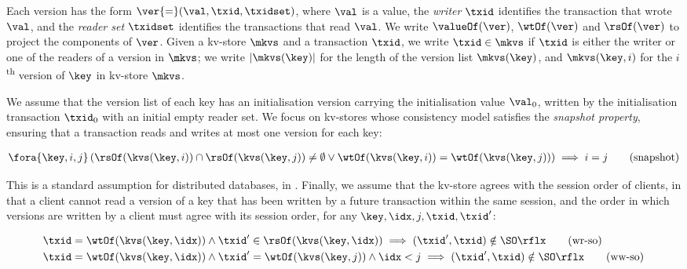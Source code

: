 Each version has the form 
\(\ver {=} (\val, \txid, \txidset)\), where \(\val\) is
a value, the \emph{writer} \(\txid\) identifies the transaction that
wrote \(\val\),  and the \emph{reader set} \(\txidset\) identifies the
transactions that read \(\val\). We write
\(\valueOf(\ver)\),
\(\wtOf(\ver)\) and \(\rsOf(\ver)\) to project
the components of \(\ver\).
Given a kv-store \(\mkvs\) and a transaction \(\txid\), we write 
\(\txid \in \mkvs\) if \(\txid\) is either the writer or 
one of the readers of a version in \(\mkvs\);
we write \(\lvert \mkvs(\key) \rvert\) for the length of the version
list \(\mkvs(\key)\),
and \(\mkvs(\key, i)\) for the \(i\)\textsuperscript{th} version of
\(\key\) in kv-store $\mkvs$.

We assume that the version list of each key has an initialisation version 
carrying the initialisation value \(\val_0\),  written by the 
initialisation transaction \(\txid_0\) with an initial empty reader set.
We focus on kv-stores whose consistency model satisfies the
\emph{snapshot property}, ensuring that
a transaction reads and writes at most one version for each key:

\SpaceAboveMath
\begin{align}
\fora{\key, i, j} 
\left( \rsOf(\kvs(\key, i)) \cap \rsOf(\kvs(\key, j)) \neq \emptyset \lor
\wtOf(\kvs(\key, i)) = \wtOf(\kvs(\key, j)) \right)
\implies i = j  
\tag{snapshot}
\label{equ:kvs-wf-txid-snapshot-property} 
\end{align}
\SpaceBelowMath

\noindent 
This is a standard assumption for distributed databases, \eg in
\cite{ramp,si,distrsi,clocksi,cops,PSI-RA,SI-RA,NMSI,PSI}.
Finally, we assume that the kv-store agrees with the session order of clients, 
in that a client cannot read a version of a key that has been written by a future transaction within
the same session, and the order in which versions are written by a
client must agree with its session order, \ie
for any \( \key,\idx,j,\txid,\txid' \):

\SpaceAboveMath
\begin{align}
& \txid = \wtOf(\kvs(\key,\idx))
\land \txid' \in \rsOf(\kvs(\key,\idx))
\implies (\txid', \txid) \notin \SO\rflx
\tag{wr-so}
\label{equ:kvs-wf-so-wr}
\\ & \txid = \wtOf(\kvs(\key,\idx))
\land \txid' = \wtOf(\kvs(\key,j))
\land \idx < j
\implies (\txid', \txid) \notin \SO\rflx
\tag{ww-so}
\label{equ:kvs-wf-so-ww}
\end{align}
\SpaceBelowMath

